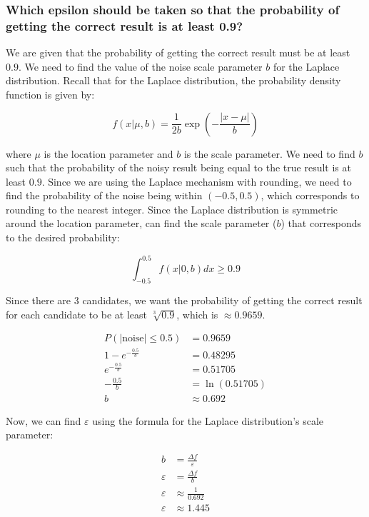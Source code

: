 \subsubsection{Which epsilon should be taken so that the probability of getting the correct result is at
least 0.9?}

We are given that the probability of getting the correct result must be at least $0.9$. We need to find the value of the noise scale parameter $b$ for the Laplace distribution. Recall that for the Laplace distribution, the probability density function is given by:

\begin{equation}
  f(x|\mu, b) = \frac{1}{2b} \exp\left(-\frac{|x - \mu|}{b}\right)
\end{equation}

where $\mu$ is the location parameter and $b$ is the scale parameter. We need to find $b$ such that the probability of the noisy result
being equal to the true result is at least $0.9$. Since we are using the Laplace mechanism with rounding, we need to find the probability of the noise being within $(-0.5, 0.5)$, which corresponds to rounding to the nearest integer. Since the Laplace distribution is symmetric~\cite[294]{laplance}
around the location parameter, can find the scale parameter ($b$) that corresponds to the desired probability:

\begin{equation}
  \int_{-0.5}^{0.5} f(x|0, b) dx \geq 0.9
\end{equation}

Since there are 3 candidates, we want the probability of getting the correct result for each candidate to be at least $\sqrt[3]{0.9}$,
which
is $\approx0.9659$.

\begin{equation}
  \begin{split}
    P(|\text{noise}| \leq 0.5) &= 0.9659 \\
    1 - e^{-\frac{0.5}{b}} &= 0.48295 \\
    e^{-\frac{0.5}{b}} &= 0.51705 \\
    -\frac{0.5}{b} &= \ln(0.51705) \\
    b &\approx 0.692
  \end{split}
\end{equation}

Now, we can find $\varepsilon$ using the formula for the Laplace distribution's scale parameter:

\begin{equation}
  \begin{split}
    b &= \frac{\Delta f}{\varepsilon} \\
    \varepsilon &= \frac{\Delta f}{b} \\
    \varepsilon &\approx \frac{1}{0.692} \\
    \varepsilon &\approx 1.445
  \end{split}
\end{equation}


